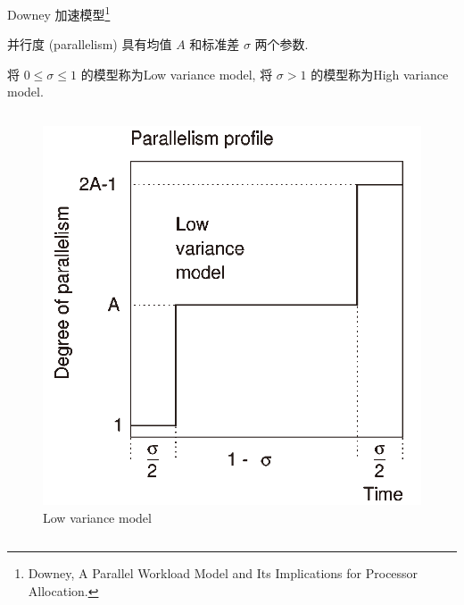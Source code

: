 \begin{frame}{Downey 加速模型\footnote{Downey, A Parallel Workload Model and Its Implications for Processor Allocation.}}

    并行度 (parallelism) 具有均值 $A$ 和标准差 $\sigma$ 两个参数.

    将 $0 \leqslant \sigma \leqslant 1$ 的模型称为Low variance model, 将 $\sigma > 1$ 的模型称为High variance model.

    \begin{columns}


        \begin{figure}
            \centering
            \includegraphics[scale=0.15]{pics/low_variance_model.png}
            \caption{Low variance model}
        \end{figure}



\end{columns}
\end{frame}
